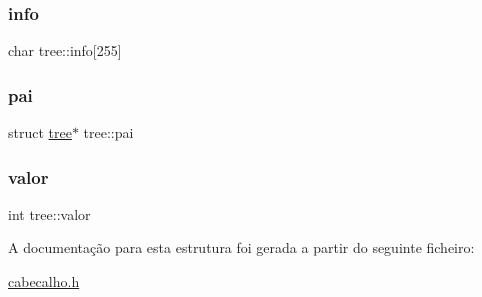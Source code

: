 \mbox{\label{structtree_a33363586fc94b74ed916c1a047b40c09}} 
\subsubsection{\texorpdfstring{info}{info}}
{\footnotesize\ttfamily char tree\+::info\mbox{[}255\mbox{]}}

\mbox{\label{structtree_a892dc68ebc0fe35b6ca7ef618a48f40a}} 
\subsubsection{\texorpdfstring{pai}{pai}}
{\footnotesize\ttfamily struct \hyperlink{structtree}{tree}$\ast$ tree\+::pai}

\mbox{\label{structtree_ab2137451cda4f3a42fb8de7085c1992c}} 
\subsubsection{\texorpdfstring{valor}{valor}}
{\footnotesize\ttfamily int tree\+::valor}



A documentação para esta estrutura foi gerada a partir do seguinte ficheiro\+:\begin{DoxyCompactItemize}
\item 
\hyperlink{cabecalho_8h}{cabecalho.\+h}\end{DoxyCompactItemize}
